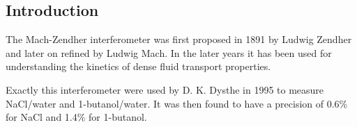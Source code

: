 \subsection {Introduction}
  The Mach-Zendher interferometer was first proposed in 1891 by Ludwig Zendher
  \cite{lz} and later on refined by Ludwig Mach\cite{lm}.
  In the later years it has been used for understanding the kinetics of dense
  fluid transport properties\cite{th,dym}.

  Exactly this interferometer were used by D. K. Dysthe in 1995 to measure
  NaCl/water and 1-butanol/water. It was then found to have a precision
  of 0.6\% for NaCl and 1.4\% for 1-butanol\cite{dag}.

